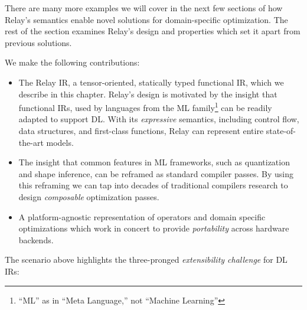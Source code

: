 There are many more examples we will cover in the next few sections of how Relay’s semantics enable novel solutions for domain-specific optimization.
The rest of the section examines Relay’s design and properties which set it apart from previous solutions.

We make the following contributions:
\begin{itemize}
  \item The Relay IR, a tensor-oriented, statically typed
    functional IR,
    which we describe in this chapter.
  Relay's design is motivated by the insight that functional IRs, used by
  languages from the ML family\footnote{``ML'' as in ``Meta Language,'' not
  ``Machine Learning''} can be readily adapted to support DL.
  With its \textit{expressive} semantics,
    including control flow, data structures, and first-class functions,
    Relay can represent entire state-of-the-art models.
  \item The insight that common features in ML frameworks,
    such as quantization and shape inference,
    can be reframed as standard compiler passes.
  By using this reframing we can tap into
    decades of traditional compilers research to design
    \textit{composable} optimization passes.
  \item
    A platform-agnostic representation of operators and domain specific
      optimizations which work in concert to provide \textit{portability}
      across hardware backends.
\end{itemize}

  The scenario above highlights the three-pronged \textit{extensibility challenge}
    for DL IRs:

